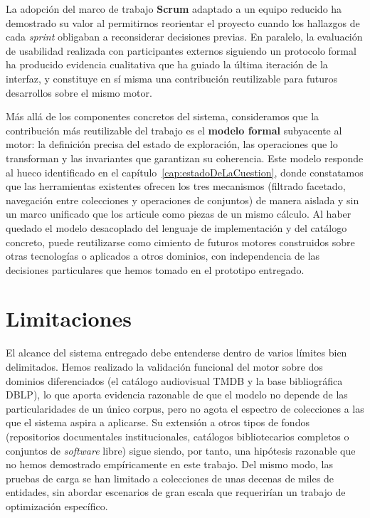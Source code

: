 La adopción del marco de trabajo \textbf{Scrum} adaptado a un equipo reducido ha demostrado su
valor al permitirnos reorientar el proyecto cuando los hallazgos de cada \textit{sprint} obligaban
a reconsiderar decisiones previas. En paralelo, la evaluación de usabilidad realizada con
participantes externos siguiendo un protocolo formal ha producido evidencia cualitativa que ha
guiado la última iteración de la interfaz, y constituye en sí misma una contribución reutilizable
para futuros desarrollos sobre el mismo motor.

Más allá de los componentes concretos del sistema, consideramos que la contribución más reutilizable
del trabajo es el \textbf{modelo formal} subyacente al motor: la definición precisa del estado de
exploración, las operaciones que lo transforman y las invariantes que garantizan su coherencia.
Este modelo responde al hueco identificado en el capítulo~\ref{cap:estadoDeLaCuestion}, donde
constatamos que las herramientas existentes ofrecen los tres mecanismos (filtrado facetado,
navegación entre colecciones y operaciones de conjuntos) de manera aislada y sin un marco unificado
que los articule como piezas de un mismo cálculo. Al haber quedado el modelo desacoplado del
lenguaje de implementación y del catálogo concreto, puede reutilizarse como cimiento de futuros
motores construidos sobre otras tecnologías o aplicados a otros dominios, con independencia de
las decisiones particulares que hemos tomado en el prototipo entregado.

\section{Limitaciones}
\label{sec:limitaciones}

El alcance del sistema entregado debe entenderse dentro de varios límites bien delimitados. Hemos
realizado la validación funcional del motor sobre dos dominios diferenciados (el catálogo
audiovisual TMDB y la base bibliográfica DBLP), lo que aporta evidencia razonable de que el
modelo no depende de las particularidades de un único corpus, pero no agota el espectro de
colecciones a las que el sistema aspira a aplicarse. Su extensión a otros tipos de fondos
(repositorios documentales institucionales, catálogos bibliotecarios completos o conjuntos de
\textit{software} libre) sigue siendo, por tanto, una hipótesis razonable que no hemos demostrado
empíricamente en este trabajo. Del mismo modo, las pruebas de carga se han limitado a
colecciones de unas decenas de miles de entidades, sin abordar escenarios de gran escala que
requerirían un trabajo de optimización específico.

